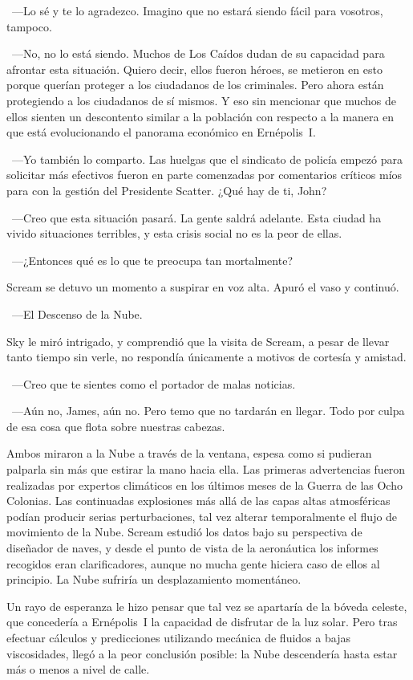 ~---Lo sé y te lo agradezco. Imagino que no estará siendo fácil para vosotros, tampoco.

~---No, no lo está siendo. Muchos de Los Caídos dudan de su capacidad para afrontar esta situación. Quiero decir, ellos fueron héroes, se metieron en esto porque querían proteger a los ciudadanos de los criminales. Pero ahora están protegiendo a los ciudadanos de sí mismos. Y eso sin mencionar que muchos de ellos sienten un descontento similar a la población con respecto a la manera en que está evolucionando el panorama económico en Ernépolis~I.

~---Yo también lo comparto. Las huelgas que el sindicato de policía empezó para solicitar más efectivos fueron en parte comenzadas por comentarios críticos míos para con la gestión del Presidente Scatter. ¿Qué hay de ti, John?

~---Creo que esta situación pasará. La gente saldrá adelante. Esta ciudad ha vivido situaciones terribles, y esta crisis social no es la peor de ellas.

~---¿Entonces qué es lo que te preocupa tan mortalmente?

Scream se detuvo un momento a suspirar en voz alta. Apuró el vaso y continuó.

~---El Descenso de la Nube.

Sky le miró intrigado, y comprendió que la visita de Scream, a pesar de llevar tanto tiempo sin verle, no respondía únicamente a motivos de cortesía y amistad.

~---Creo que te sientes como el portador de malas noticias.

~---Aún no, James, aún no. Pero temo que no tardarán en llegar. Todo por culpa de esa cosa que flota sobre nuestras cabezas.

Ambos miraron a la Nube a través de la ventana, espesa como si pudieran palparla sin más que estirar la mano hacia ella. Las primeras advertencias fueron realizadas por expertos climáticos en los últimos meses de la Guerra de las Ocho Colonias. Las continuadas explosiones más allá de las capas altas atmosféricas podían producir serias perturbaciones, tal vez alterar temporalmente el flujo de movimiento de la Nube. Scream estudió los datos bajo su perspectiva de diseñador de naves, y desde el punto de vista de la aeronáutica los informes recogidos eran clarificadores, aunque no mucha gente hiciera caso de ellos al principio. La Nube sufriría un desplazamiento momentáneo.

Un rayo de esperanza le hizo pensar que tal vez se apartaría de la bóveda celeste, que concedería a Ernépolis~I la capacidad de disfrutar de la luz solar. Pero tras efectuar cálculos y predicciones utilizando mecánica de fluidos a bajas viscosidades, llegó a la peor conclusión posible: la Nube descendería hasta estar más o menos a nivel de calle.

